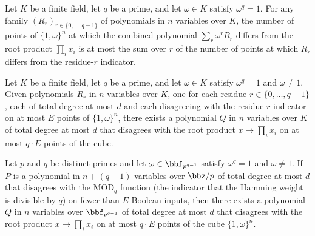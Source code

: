 \begin{theorem}
\label{RazborovSmolensky.rootCubeBadCount_residueCombination_le_sum}
\leanok
{}
Let $K$ be a finite field, let $q$ be a prime, and let $\omega \in K$ satisfy
$\omega^q = 1$.  For any family $(R_r)_{r \in \{0,\dots,q-1\}}$ of polynomials in $n$
variables over $K$, the number of points of $\{1,\omega\}^n$ at which the combined
polynomial $\sum_{r} \omega^{r} R_r$ differs from the root product $\prod_i x_i$ is at
most the sum over $r$ of the number of points at which $R_r$ differs from the
residue-$r$ indicator.
\end{theorem}

\begin{theorem}
\label{RazborovSmolensky.root_residue_approximants_combine_to_rootProduct}
\leanok
{}
Let $K$ be a finite field, let $q$ be a prime, and let $\omega \in K$ satisfy
$\omega^q = 1$ and $\omega \neq 1$.  Given polynomials $R_r$ in $n$ variables over $K$,
one for each residue $r \in \{0,\dots,q-1\}$, each of total degree at most $d$ and each
disagreeing with the residue-$r$ indicator on at most $E$ points of $\{1,\omega\}^n$,
there exists a polynomial $Q$ in $n$ variables over $K$ of total degree at most $d$ that
disagrees with the root product $x \mapsto \prod_i x_i$ on at most $q \cdot E$ points of
the cube.
\end{theorem}

\begin{theorem}
\label{RazborovSmolensky.padded_modQ_approx_transfers_to_rootProduct_qE}
\leanok
{}
Let $p$ and $q$ be distinct primes and let $\omega \in \bbf_{p^{q-1}}$ satisfy
$\omega^q = 1$ and $\omega \neq 1$.  If $P$ is a polynomial in $n + (q-1)$ variables
over $\bbz/p$ of total degree at most $d$ that disagrees with the $\mathrm{MOD}_q$
function (the indicator that the Hamming weight is divisible by $q$) on fewer than $E$
Boolean inputs, then there exists a polynomial $Q$ in $n$ variables over
$\bbf_{p^{q-1}}$ of total degree at most $d$ that disagrees with the root product
$x \mapsto \prod_i x_i$ on at most $q \cdot E$ points of the cube $\{1,\omega\}^n$.
\end{theorem}

